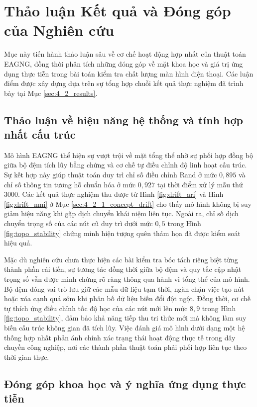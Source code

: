 \section{Thảo luận Kết quả và Đóng góp của Nghiên cứu}
\label{sec:4_3_discussion_contributions}

Mục này tiến hành thảo luận sâu về cơ chế hoạt động hợp nhất của thuật toán EAGNG, đồng thời phân tích những đóng góp về mặt khoa học và giá trị ứng dụng thực tiễn trong bài toán kiểm tra chất lượng màn hình điện thoại. Các luận điểm được xây dựng dựa trên sự tổng hợp chuỗi kết quả thực nghiệm đã trình bày tại Mục \ref{sec:4_2_results}.

\subsection{Thảo luận về hiệu năng hệ thống và tính hợp nhất cấu trúc}
\label{sec:4_3_1_system_performance}

Mô hình EAGNG thể hiện sự vượt trội về mặt tổng thể nhờ sự phối hợp đồng bộ giữa bộ đệm tích lũy bằng chứng và cơ chế tự điều chỉnh độ linh hoạt cấu trúc. Sự kết hợp này giúp thuật toán duy trì chỉ số điều chỉnh Rand ở mức $0{,}895$ và chỉ số thông tin tương hỗ chuẩn hóa ở mức $0{,}927$ tại thời điểm xử lý mẫu thứ $3000$. Các kết quả thực nghiệm thu được từ Hình \ref{fig:drift_ari} và Hình \ref{fig:drift_nmi} ở Mục \ref{sec:4_2_1_concept_drift} cho thấy mô hình không bị suy giảm hiệu năng khi gặp dịch chuyển khái niệm liên tục. Ngoài ra, chỉ số dịch chuyển trọng số của các nút cũ duy trì dưới mức $0{,}5$ trong Hình \ref{fig:topo_stability} chứng minh hiện tượng quên thảm họa đã được kiểm soát hiệu quả.

Mặc dù nghiên cứu chưa thực hiện các bài kiểm tra bóc tách riêng biệt từng thành phần cải tiến, sự tương tác đồng thời giữa bộ đệm và quy tắc cập nhật trọng số vẫn được minh chứng rõ ràng thông qua hành vi tổng thể của mô hình. Bộ đệm đóng vai trò lưu giữ các mẫu dữ liệu tạm thời, ngăn chặn việc tạo nút hoặc xóa cạnh quá sớm khi phân bố dữ liệu biến đổi đột ngột. Đồng thời, cơ chế tự thích ứng điều chỉnh tốc độ học của các nút mới lên mức $8{,}9$ trong Hình \ref{fig:topo_stability}, đảm bảo khả năng tiếp thu tri thức mới mà không làm suy biến cấu trúc không gian đã tích lũy. Việc đánh giá mô hình dưới dạng một hệ thống hợp nhất phản ánh chính xác trạng thái hoạt động thực tế trong dây chuyền công nghiệp, nơi các thành phần thuật toán phải phối hợp liên tục theo thời gian thực.

\subsection{Đóng góp khoa học và ý nghĩa ứng dụng thực tiễn}
\label{sec:4_3_2_contributions}

